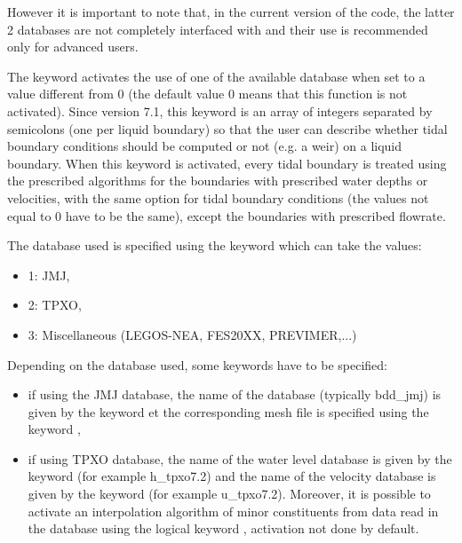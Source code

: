 However it is important to note that, in the current version of the code, the latter 2 databases are not completely interfaced with  and their use is recommended only for advanced users.

The keyword  activates the use of
one of the available database when set to a value different from 0
(the default value 0 means that this function is not activated). 
Since version 7.1, this keyword is an array of integers separated by semicolons
(one per liquid boundary) so that the user can describe whether tidal boundary
conditions should be computed or not (e.g. a weir) on a liquid boundary. 
When this keyword is activated, every tidal
boundary is treated using the prescribed algorithms for the boundaries with
prescribed water depths or velocities, with the same option for tidal boundary
conditions (the values not equal to 0 have to be the same),
except the boundaries with prescribed flowrate.

 The database used is specified using the keyword which can take the values:

\begin{itemize}
\item [\nonumber] 1: JMJ,

\item [\nonumber] 2: TPXO,

\item [\nonumber] 3: Miscellaneous (LEGOS-NEA, FES20XX, PREVIMER,...)
\end{itemize}

  Depending on the database used, some keywords have to be specified:

\begin{itemize}
\item  if using the JMJ database, the name of the database (typically bdd\_jmj) is given by the keyword  et the corresponding mesh file is specified using the keyword ,

\item  if using TPXO database, the name of the water level database is given by the keyword  (for example h\_tpxo7.2) and the name of the velocity database is given by the keyword  (for example u\_tpxo7.2). Moreover, it is possible to activate an interpolation algorithm of minor constituents from data read in the database using the logical keyword , activation not done by default.
\end{itemize}

